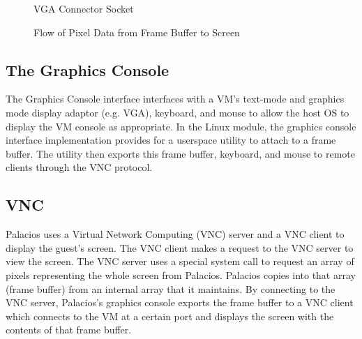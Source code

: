 \documentclass{acm_proc_article-sp}
\begin{document}
\begin{figure}                                              
\centering                                                     
{}                   
\caption{VGA Connector Socket}   
\end{figure} 

\begin{figure}                                              
\centering                                                     
{}                   
\caption{Flow of Pixel Data from Frame Buffer to Screen}   
\end{figure} 

\subsection{The Graphics Console} %
The Graphics Console interface interfaces with a VM's text\--mode and graphics
mode display adaptor (e.g. VGA), keyboard, and mouse to allow the host OS to display the VM
console as appropriate. In the Linux module, the graphics console interface implementation provides
for a userspace utility to attach to a frame buffer. The utility then exports this frame buffer, keyboard,
and mouse to remote clients through the VNC protocol. \cite{Dinda: Technical}

\subsection{VNC}
Palacios uses a Virtual Network Computing (VNC) server and a VNC client to
display the guest's screen. The VNC client makes a request to the VNC server to view the screen. 
The VNC server uses a special system call to request an array of pixels representing the whole screen from Palacios. 
Palacios copies into that array (frame buffer) from an internal array that it
maintains. By connecting to the VNC server, Palacios's graphics console exports
the frame buffer to a VNC client which connects to the VM at a certain port and
displays the screen with the contents of that frame buffer.
\end{document}
